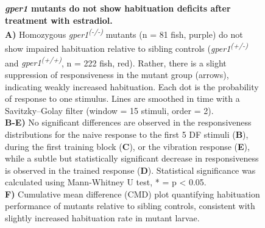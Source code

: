 \documentclass[9.5pt,lineno]{RandlettLab_elife}
\begin{document}
{\begin{figure}
\begin{center}
\end{center}

\endinternallinenumbers
\end{figure}


\begin{figure}
\internallinenumbers

\begin{center}
\caption{\textbf{\emph{gper1} mutants do not show habituation deficits after treatment with estradiol.} \doublespacing
\\ \textbf{A)} Homozygous \emph{gper1\textsuperscript{(-/-)}} mutants (n = 81 fish, purple) do not show impaired habituation relative to sibling controls (\emph{gper1\textsuperscript{(+/-)}} and \emph{gper1\textsuperscript{(+/+)}}, n = 222 fish, red). Rather, there is a slight suppression of responsiveness in the mutant group (arrows), indicating weakly increased habituation. Each dot is the probability of response to one stimulus. Lines are smoothed in time with a Savitzky–Golay filter (window = 15 stimuli, order = 2).
\\ \textbf{B-E)} No significant differences are observed in the responsiveness distributions for the naive response to the first 5 DF stimuli (\textbf{B}), during the first training block (\textbf{C}), or the vibration response (\textbf{E}), while a subtle but statistically significant decrease in responsiveness is observed in the trained response (\textbf{D}). Statistical significance was calculated using Mann-Whitney U test, * = p < 0.05.
\\ \textbf{F)} Cumulative mean difference (CMD) plot quantifying habituation performance of mutants relative to sibling controls, consistent with slightly increased habituation rate in mutant larvae. 
}
\label{fig:2}

\end{center}

\endinternallinenumbers
\end{figure}


}
\end{document}
